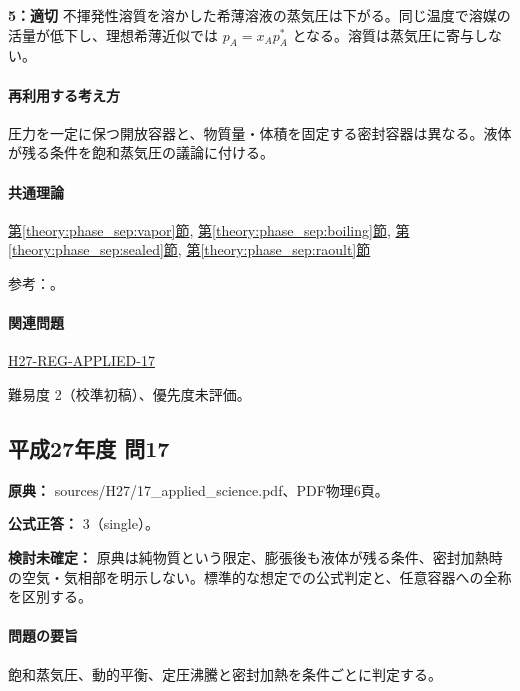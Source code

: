 \noindent\textbf{5：適切} 不揮発性溶質を溶かした希薄溶液の蒸気圧は下がる。同じ温度で溶媒の活量が低下し、理想希薄近似では \(p_A=x_Ap_A^*\) となる。溶質は蒸気圧に寄与しない。\par

\paragraph{再利用する考え方} 圧力を一定に保つ開放容器と、物質量・体積を固定する密封容器は異なる。液体が残る条件を飽和蒸気圧の議論に付ける。

\paragraph{共通理論} \hyperref[theory:phase_sep:vapor]{第\ref*{theory:phase_sep:vapor}節}, \hyperref[theory:phase_sep:boiling]{第\ref*{theory:phase_sep:boiling}節}, \hyperref[theory:phase_sep:sealed]{第\ref*{theory:phase_sep:sealed}節}, \hyperref[theory:phase_sep:raoult]{第\ref*{theory:phase_sep:raoult}節}

\par 参考：\cite{mit_solutions2008,mit_clapeyron2008}。

\paragraph{関連問題} \hyperref[q:h27-reg-applied-17]{H27-REG-APPLIED-17}

\par 難易度 2（校準初稿）、優先度未評価。

\subsection{平成27年度 問17}
\label{q:h27-reg-applied-17}

\noindent\textbf{原典：} sources/H27/17\_applied\_science.pdf、PDF物理6頁。

\textbf{公式正答：} 3（single）。

\par\textbf{検討未確定：} 原典は純物質という限定、膨張後も液体が残る条件、密封加熱時の空気・気相部を明示しない。標準的な想定での公式判定と、任意容器への全称を区別する。

\paragraph{問題の要旨} 飽和蒸気圧、動的平衡、定圧沸騰と密封加熱を条件ごとに判定する。

